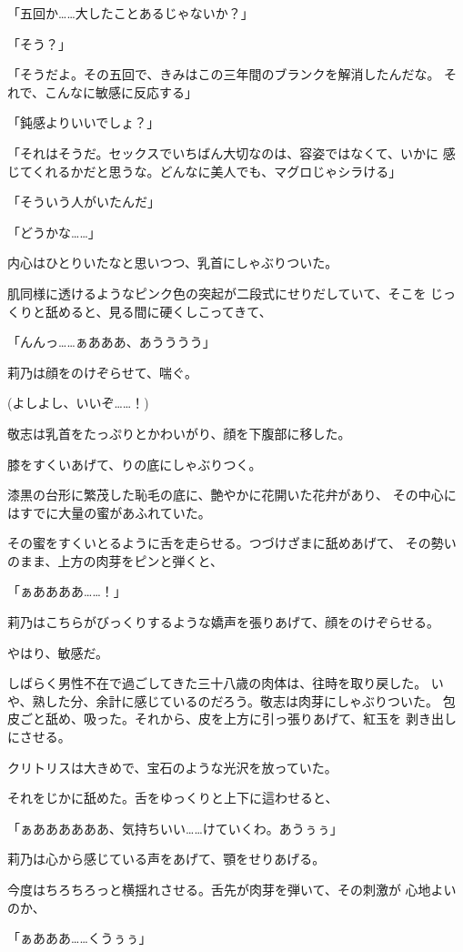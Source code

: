 ﻿\documentclass[
    book,tate,
    line_length=30zw,
    jafontsize=12pt,
    paper=b5j,
    landscape,
    ]{jlreq}
\begin{document}
「五回か……大したことあるじゃないか？」

「そう？」

「そうだよ。その五回で、きみはこの三年間のブランクを解消したんだな。
それで、こんなに敏感に反応する」

「鈍感よりいいでしょ？」

「それはそうだ。セックスでいちばん大切なのは、容姿ではなくて、いかに
感じてくれるかだと思うな。どんなに美人でも、マグロじゃシラける」

「そういう人がいたんだ」

「どうかな……」

内心はひとりいたなと思いつつ、乳首にしゃぶりついた。

肌同様に透けるようなピンク色の突起が二段式にせりだしていて、そこを
じっくりと舐めると、見る間に硬くしこってきて、

「んんっ……ぁあああ、あうううう」

莉乃は顔をのけぞらせて、喘ぐ。

(よしよし、いいぞ……！)

敬志は乳首をたっぷりとかわいがり、顔を下腹部に移した。

膝をすくいあげて、りの底にしゃぶりつく。

漆黒の台形に繁茂した恥毛の底に、艶やかに花開いた花弁があり、
その中心にはすでに大量の蜜があふれていた。

その蜜をすくいとるように舌を走らせる。つづけざまに舐めあげて、
その勢いのまま、上方の肉芽をピンと弾くと、

「ぁああああ……！」

莉乃はこちらがびっくりするような嬌声を張りあげて、顔をのけぞらせる。

やはり、敏感だ。

しばらく男性不在で過ごしてきた三十八歳の肉体は、往時を取り戻した。
いや、熟した分、余計に感じているのだろう。敬志は肉芽にしゃぶりついた。
包皮ごと舐め、吸った。それから、皮を上方に引っ張りあげて、紅玉を
剥き出しにさせる。

クリトリスは大きめで、宝石のような光沢を放っていた。

それをじかに舐めた。舌をゆっくりと上下に這わせると、

「ぁああああああ、気持ちいい……けていくわ。あうぅぅ」

莉乃は心から感じている声をあげて、顎をせりあげる。

今度はちろちろっと横揺れさせる。舌先が肉芽を弾いて、その刺激が
心地よいのか、

「ぁあああ……くうぅぅ」
\end{document}

